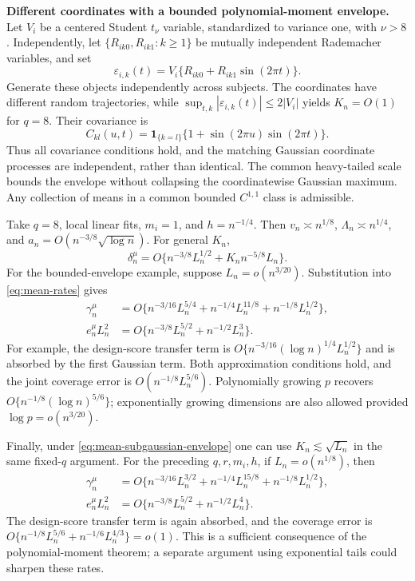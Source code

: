 \documentclass[10pt]{book}
\numberwithin{equation}{section}
\newcommand{\referencefont}{\bibhang=1.7pc\bibsep=2pt\fontsize{9}{14pt plus.8pt minus .6pt}\selectfont}
\begin{document}
\noindent\textbf{Different coordinates with a bounded polynomial-moment envelope.}
Let $V_i$ be a centered Student $t_\nu$ variable, standardized to
variance one, with $\nu>8$. Independently, let
$\{R_{ik0},R_{ik1}:k\ge1\}$ be mutually independent Rademacher
variables, and set
\[
\varepsilon_{i,k}(t)=V_i\{R_{ik0}+R_{ik1}\sin(2\pi t)\}.
\]
Generate these objects independently across subjects.
The coordinates have different random trajectories, while
$\sup_{t,k}|\varepsilon_{i,k}(t)|\le2|V_i|$ yields $K_n=O(1)$
for $q=8$. Their covariance is
\[
C_{kl}(u,t)=\mathbf1_{\{k=l\}}
\{1+\sin(2\pi u)\sin(2\pi t)\}.
\]
Thus all covariance conditions hold, and the matching Gaussian
coordinate processes are independent, rather than identical.
The common heavy-tailed scale bounds the envelope without collapsing
the coordinatewise Gaussian maximum. Any collection of means in a
common bounded $C^{1,1}$ class is admissible.

Take $q=8$, local linear fits, $m_i=1$, and $h=n^{-1/4}$.
Then $v_n\asymp n^{1/8}$, $\Lambda_n\asymp n^{1/4}$, and
$a_n=O(n^{-3/8}\sqrt{\log n})$. For general $K_n$,
\[
\delta_n^\mu=O\{n^{-3/8}L_n^{1/2}+K_n n^{-5/8}L_n\}.
\]
For the bounded-envelope example, suppose $L_n=o(n^{3/20})$.
Substitution into \eqref{eq:mean-rates} gives
\[
\begin{aligned}
\gamma_n^\mu&=O\{n^{-3/16}L_n^{5/4}
+n^{-1/4}L_n^{11/8}+n^{-1/8}L_n^{1/2}\},\\
e_n^\mu L_n^2&=O\{n^{-3/8}L_n^{5/2}+n^{-1/2}L_n^3\}.
\end{aligned}
\]
For example, the design-score transfer term is
$O\{n^{-3/16}(\log n)^{1/4}L_n^{1/2}\}$ and is absorbed by
the first Gaussian term. Both approximation conditions hold, and
the joint coverage error is $O(n^{-1/8}L_n^{5/6})$.
Polynomially growing $p$ recovers
$O\{n^{-1/8}(\log n)^{5/6}\}$; exponentially growing dimensions
are also allowed provided $\log p=o(n^{3/20})$.

Finally, under \eqref{eq:mean-subgaussian-envelope} one can use
$K_n\lesssim\sqrt{L_n}$ in the same fixed-$q$ argument.
For the preceding $q,r,m_i,h$, if $L_n=o(n^{1/8})$, then
\[
\begin{aligned}
\gamma_n^\mu&=O\{n^{-3/16}L_n^{3/2}
+n^{-1/4}L_n^{15/8}+n^{-1/8}L_n^{1/2}\},\\
e_n^\mu L_n^2&=O\{n^{-3/8}L_n^{5/2}+n^{-1/2}L_n^4\}.
\end{aligned}
\]
The design-score transfer term is again absorbed, and the coverage
error is
$O\{n^{-1/8}L_n^{5/6}+n^{-1/6}L_n^{4/3}\}=o(1)$.
This is a sufficient consequence of the polynomial-moment theorem;
a separate argument using exponential tails could sharpen these rates.



\referencefont
\referencefont


\end{document}
